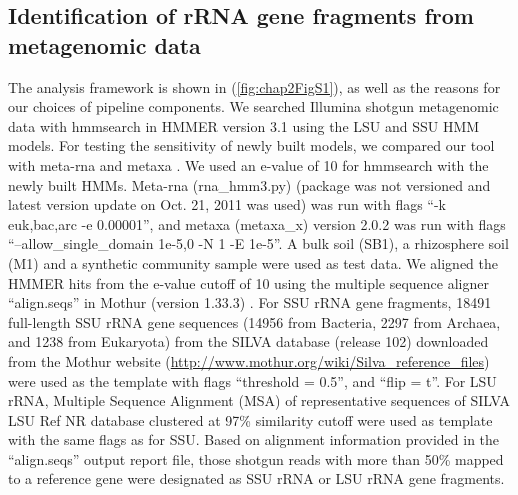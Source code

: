 \documentclass[]{msu-thesis}
\begin{document}
\subsection{Identification of rRNA gene fragments from metagenomic data}
The analysis framework is shown in (\cref{fig:chap2FigS1}), as well as the reasons for our choices of pipeline components. We searched Illumina shotgun metagenomic data with hmmsearch in HMMER version 3.1 \cite{eddy_new_2009} using the LSU and SSU HMM models. For testing the sensitivity of newly built models, we compared our tool with meta-rna \cite{huang_identification_2009} and metaxa \cite{bengtsson_metaxa:_2011}. We used an e-value of 10 for hmmsearch with the newly built HMMs. Meta-rna (rna\_hmm3.py) (package was not versioned and latest version update on Oct. 21, 2011 was used) was run with flags ``-k euk,bac,arc -e 0.00001'', and metaxa (metaxa\_x) version 2.0.2 was run with flags ``--allow\_single\_domain 1e-5,0 -N 1 -E 1e-5''. A bulk soil (SB1), a rhizosphere soil (M1) and a synthetic community sample \cite{shakya_comparative_2013} were used as test data. We aligned the HMMER hits from the e-value cutoff of 10 using the multiple sequence aligner ``align.seqs'' in Mothur (version 1.33.3) \cite{schloss_high-throughput_2009}. For SSU rRNA gene fragments, 18491 full-length SSU rRNA gene sequences (14956 from Bacteria, 2297 from Archaea, and 1238 from Eukaryota) from the SILVA database (release 102) \cite{quast_silva_2013} downloaded from the Mothur website (\url{http://www.mothur.org/wiki/Silva\_reference\_files}) were used as the template with flags ``threshold = 0.5'', and ``flip = t''. For LSU rRNA, Multiple Sequence Alignment (MSA) of representative sequences of SILVA LSU Ref NR database clustered at 97\% similarity cutoff were used as template with the same flags as for SSU. Based on alignment information provided in the ``align.seqs'' output report file, those shotgun reads with more than 50\% mapped to a reference gene were designated as SSU rRNA or LSU rRNA gene fragments.


\end{document}
